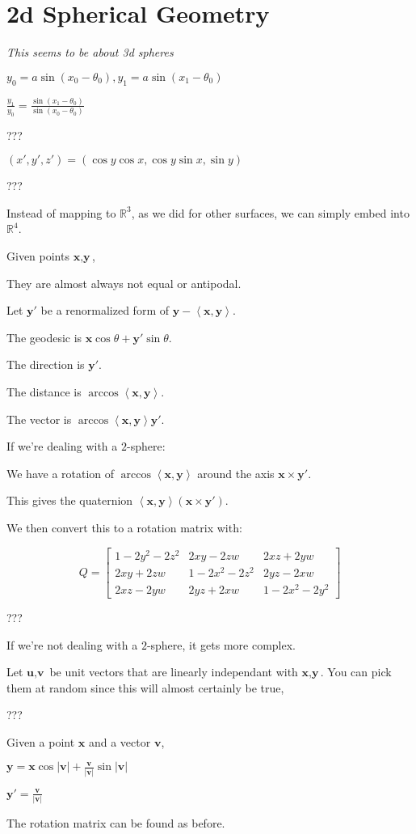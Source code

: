 \section{2d Spherical Geometry}

\emph{This seems to be about 3d spheres}

$y_0 = a\sin(x_0-\theta_0), y_1 = a\sin(x_1-\theta_0)$

$\frac{y_1}{y_0} = \frac{\sin(x_1-\theta_0)}{\sin(x_0-\theta_0)}$

???

$(x',y',z') = (\cos y \cos x, \cos y \sin x, \sin y)$

???

Instead of mapping to $\mathbb{R}^3$, as we did for other surfaces, we can simply embed into $\mathbb{R}^4$.


Given points $\textbf{x}, \textbf{y}$,

They are almost always not equal or antipodal.

Let $\textbf{y}'$ be a renormalized form of $\textbf{y}-\left<\textbf{x},\textbf{y}\right>$.

The geodesic is $\textbf{x}\cos\theta+\textbf{y}'\sin\theta$.

The direction is $\textbf{y}'$.

The distance is $\arccos\left<\textbf{x},\textbf{y}\right>$.

The vector is $\arccos\left<\textbf{x},\textbf{y}\right>\textbf{y}'$.

If we're dealing with a $2$-sphere:

We have a rotation of $\arccos\left<\textbf{x},\textbf{y}\right>$ around the axis $\textbf{x} \times \textbf{y}'$.

This gives the quaternion $\left<\textbf{x},\textbf{y}\right>(\textbf{x} \times \textbf{y}')$.

We then convert this to a rotation matrix with:

$$Q = \begin{bmatrix}
    1 - 2 y^2 - 2 z^2 & 2 x y - 2 z w & 2 x z + 2 y w \\
    2 x y + 2 z w & 1 - 2 x^2 - 2 z^2 & 2 y z - 2 x w \\
    2 x z - 2 y w & 2 y z + 2 x w & 1 - 2 x^2 - 2 y^2
\end{bmatrix}$$

???

If we're not dealing with a $2$-sphere, it gets more complex.

Let $\textbf{u}, \textbf{v}$ be unit vectors that are linearly independant with $\textbf{x}, \textbf{y}$. You can pick them at random since this will almost certainly be true, 

???

Given a point $\textbf{x}$ and a vector $\textbf{v}$,

$\textbf{y} = \textbf{x}\cos|\textbf{v}|+\frac{\textbf{v}}{|\textbf{v}|}\sin|\textbf{v}|$

$\textbf{y}' = \frac{\textbf{v}}{|\textbf{v}|}$

The rotation matrix can be found as before.


